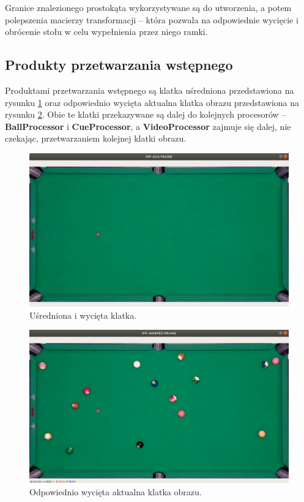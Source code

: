 \documentclass[12pt]{article}
\begin{document}
    Granice znalezionego prostokąta wykorzystywane są do utworzenia, a potem polepszenia macierzy transformacji – która pozwala na odpowiednie wycięcie i obrócenie stołu w celu wypełnienia przez niego ramki.


\subsection{Produkty przetwarzania wstępnego}

Produktami przetwarzania wstępnego są klatka uśredniona przedstawiona na rysunku \ref{avg_frame} oraz odpowiednio wycięta aktualna klatka obrazu przedstawiona na rysunku \ref{warped_frame}. Obie te klatki przekazywane są dalej do kolejnych procesorów – \textbf{BallProcessor} i \textbf{CueProcessor}, a \textbf{VideoProcessor} zajmuje się dalej, nie czekając, przetwarzaniem kolejnej klatki obrazu.


\begin{figure}[h]
    \centering
    \includegraphics[width=15cm]{./images/obrazki/ifp/avg_frame.png}
    \caption{Uśredniona i wycięta klatka.}
    \label{avg_frame}
\end{figure}

\begin{figure}[h]
    \centering
    \includegraphics[width=15cm]{./images/obrazki/ifp/warped_frame.png}
    \caption{Odpowiednio wycięta aktualna klatka obrazu.}
    \label{warped_frame}
\end{figure}
\end{document}
